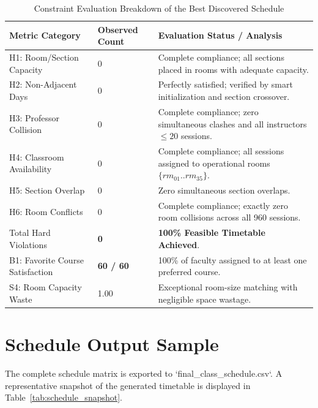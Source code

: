 \begin{table}[H]
  \centering
  \small
  \caption{Constraint Evaluation Breakdown of the Best Discovered Schedule}
  \label{tab:final_metrics_summary}
  \begin{tabularx}{\linewidth}{L{4.5cm} C{3.0cm} X}
    \toprule
    \color{PrismWhite}\textbf{Metric Category} & 
    \color{PrismWhite}\textbf{Observed Count} & 
    \color{PrismWhite}\textbf{Evaluation Status / Analysis} \\
    \midrule
    H1: Room/Section Capacity & 0 & Complete compliance; all sections placed in rooms with adequate capacity. \\
    H2: Non-Adjacent Days & 0 & Perfectly satisfied; verified by smart initialization and section crossover. \\
    H3: Professor Collision & 0 & Complete compliance; zero simultaneous clashes and all instructors $\le 20$ sessions. \\
    H4: Classroom Availability & 0 & Complete compliance; all sessions assigned to operational rooms $\{rm_{01}..rm_{35}\}$. \\
    H5: Section Overlap & 0 & Zero simultaneous section overlaps. \\
    H6: Room Conflicts & 0 & Complete compliance; exactly zero room collisions across all 960 sessions. \\
    \midrule
    Total Hard Violations & \textbf{0} & \textbf{100\% Feasible Timetable Achieved}. \\
    \midrule
    B1: Favorite Course Satisfaction & \textbf{60 / 60} & 100\% of faculty assigned to at least one preferred course. \\
    S4: Room Capacity Waste & 1.00 & Exceptional room-size matching with negligible space wastage. \\
    \bottomrule
  \end{tabularx}
\end{table}

\section{Schedule Output Sample}
The complete schedule matrix is exported to `final_class_schedule.csv`. A representative snapshot of the generated timetable is displayed in Table~\ref{tab:schedule_snapshot}.

